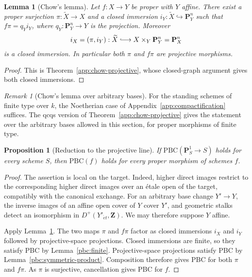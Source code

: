 \documentclass[11pt,a4paper]{article}
\numberwithin{equation}{section}
\newtheorem{lemma}[theorem]{Lemma}
\newtheorem{proposition}[theorem]{Proposition}
\theoremstyle{definition}
\theoremstyle{remark}
\newtheorem{remark}[theorem]{Remark}
\newcommand{\D}{D}
\newcommand{\et}{\acute{e}t}
\newcommand{\Z}{\mathbf Z}
\begin{document}
\begin{lemma}[Chow's lemma]\label{pbc:chow}
Let $f:X\to Y$ be proper with $Y$ affine. There exist a proper
surjection $\pi:\widetilde X\to X$ and a closed immersion
$i_Y:\widetilde X\hookrightarrow\mathbf P^n_Y$ such that
$f\pi=q_Yi_Y$, where $q_Y:\mathbf P^n_Y\to Y$ is the projection.
Moreover
\[
 i_X=(\pi,i_Y):\widetilde X\lhook\joinrel\longrightarrow
       X\times_Y\mathbf P^n_Y=\mathbf P^n_X
\]
is a closed immersion. In particular both $\pi$ and $f\pi$ are
projective morphisms.
\end{lemma}

\begin{proof}
This is Theorem~\ref{app:chow-projective}, whose closed-graph argument
gives both closed immersions.
\end{proof}

\begin{remark}[Chow's lemma over arbitrary bases]\label{pbc:chow-scope}
For the standing schemes of finite type over $k$, the Noetherian case
of Appendix~\ref{app:compactification} suffices. The qcqs version of
Theorem~\ref{app:chow-projective} gives the statement over the
arbitrary bases allowed in this section, for proper morphisms of finite
type.
\end{remark}

\begin{proposition}[Reduction to the projective line]\label{pbc:reduction}
If $\mathrm{PBC}(\mathbf P^1_S\to S)$ holds for every scheme $S$,
then $\mathrm{PBC}(f)$ holds for every proper morphism of schemes $f$.
\end{proposition}

\begin{proof}
The assertion is local on the target. Indeed, higher direct images
restrict to the corresponding higher direct images over an \'etale
open of the target, compatibly with the canonical exchange. For an
arbitrary base change $Y'\to Y$, the inverse images of an affine open
cover of $Y$ cover $Y'$, and geometric stalks detect an isomorphism in
$\D^+(Y'_{\et},\Z)$.
We may therefore suppose $Y$ affine.

Apply Lemma~\ref{pbc:chow}. The two maps $\pi$ and $f\pi$ factor as
closed immersions $i_X$ and $i_Y$ followed by projective-space
projections. Closed immersions are finite, so they satisfy PBC by
Lemma~\ref{pbc:finite}. Projective-space projections satisfy PBC by
Lemma~\ref{pbc:symmetric-product}. Composition therefore gives PBC for
both $\pi$ and $f\pi$. As $\pi$ is surjective, cancellation gives PBC
for $f$.
\end{proof}
\end{document}
